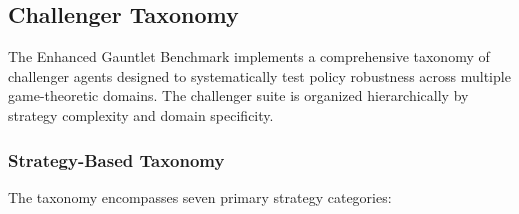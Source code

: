 \documentclass[sigconf,anonymous]{aamas}
\begin{document}
\subsection{Challenger Taxonomy}

The Enhanced Gauntlet Benchmark implements a comprehensive taxonomy of challenger agents designed to systematically test policy robustness across multiple game-theoretic domains. The challenger suite is organized hierarchically by strategy complexity and domain specificity.

\subsubsection{Strategy-Based Taxonomy}

The taxonomy encompasses seven primary strategy categories:
\end{document}
